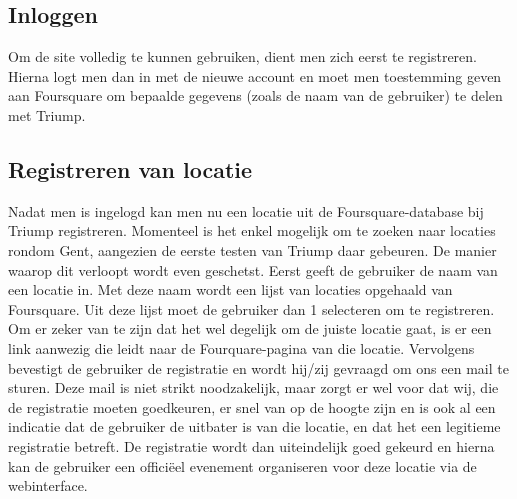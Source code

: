 \subsection{Inloggen}
Om de site volledig te kunnen gebruiken, dient men zich eerst te registreren. Hierna logt men dan in met de nieuwe account en moet men toestemming geven aan Foursquare om bepaalde gegevens (zoals de naam van de gebruiker) te delen met Triump. 
\subsection{Registreren van locatie}
Nadat men is ingelogd kan men nu een locatie uit de Foursquare-database bij Triump registreren.
Momenteel is het enkel mogelijk om te zoeken naar locaties rondom Gent, aangezien de eerste testen van Triump daar gebeuren.
De manier waarop dit verloopt wordt even geschetst. Eerst geeft de gebruiker de naam van een locatie in. Met deze naam wordt een lijst van locaties opgehaald van Foursquare.
Uit deze lijst moet de gebruiker dan 1 selecteren om te registreren. Om er zeker van te zijn dat het wel degelijk om de juiste locatie gaat, is er een link aanwezig die leidt naar de Fourquare-pagina van die locatie.
Vervolgens bevestigt de gebruiker de registratie en wordt hij/zij gevraagd om ons een mail te sturen. Deze mail is niet strikt noodzakelijk, maar zorgt er wel voor dat wij, die de registratie moeten goedkeuren, er snel van op de hoogte zijn en is ook al een indicatie dat de gebruiker de uitbater is van die locatie, en dat het een legitieme registratie betreft.
De registratie wordt dan uiteindelijk goed gekeurd en hierna kan de gebruiker een officiëel evenement organiseren voor deze locatie via de webinterface.

